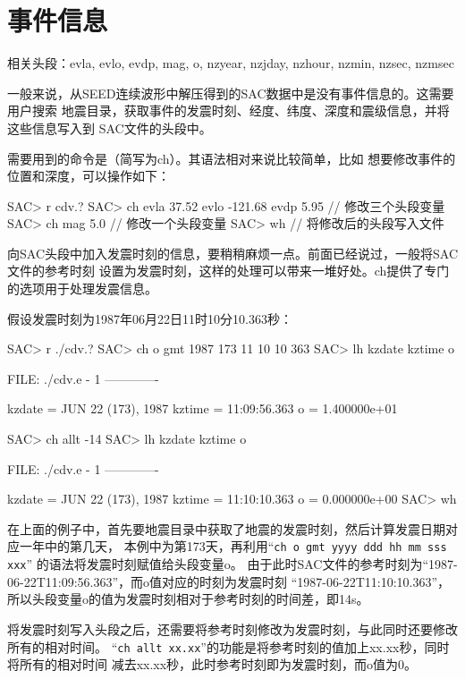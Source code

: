 \section{事件信息}
\label{sec:event-info}
相关头段：evla, evlo, evdp, mag, o, nzyear, nzjday, nzhour, nzmin, nzsec, nzmsec

一般来说，从SEED连续波形中解压得到的SAC数据中是没有事件信息的。这需要用户搜索
地震目录，获取事件的发震时刻、经度、纬度、深度和震级信息，并将这些信息写入到
SAC文件的头段中。

需要用到的命令是（简写为ch）。其语法相对来说比较简单，比如
想要修改事件的位置和深度，可以操作如下：
\begin{SACCode}
SAC> r cdv.?
SAC> ch evla 37.52 evlo -121.68 evdp 5.95   // 修改三个头段变量
SAC> ch mag 5.0                             // 修改一个头段变量
SAC> wh                                     // 将修改后的头段写入文件
\end{SACCode}

向SAC头段中加入发震时刻的信息，要稍稍麻烦一点。前面已经说过，一般将SAC文件的参考时刻
设置为发震时刻，这样的处理可以带来一堆好处。ch提供了专门的选项用于处理发震信息。

假设发震时刻为1987年06月22日11时10分10.363秒：
\label{code:origin-time}
\begin{SACCode}
SAC> r ./cdv.?
SAC> ch o gmt 1987 173 11 10 10 363
SAC> lh kzdate kztime o
  
  FILE: ./cdv.e - 1
 -------------

     kzdate = JUN 22 (173), 1987
     kztime = 11:09:56.363
          o = 1.400000e+01
  
SAC> ch allt -14
SAC> lh kzdate kztime o
  
  FILE: ./cdv.e - 1
 -------------

     kzdate = JUN 22 (173), 1987
     kztime = 11:10:10.363
          o = 0.000000e+00
SAC> wh
\end{SACCode}

在上面的例子中，首先要地震目录中获取了地震的发震时刻，然后计算发震日期对应一年中的第几天，
本例中为第173天，再利用``\lstinline{ch o gmt yyyy ddd hh mm sss xxx}''
的语法将发震时刻赋值给头段变量o。
由于此时SAC文件的参考时刻为``1987-06-22T11:09:56.363''，而o值对应的时刻为发震时刻
``1987-06-22T11:10:10.363''，所以头段变量o的值为发震时刻相对于参考时刻的时间差，即14s。

将发震时刻写入头段之后，还需要将参考时刻修改为发震时刻，与此同时还要修改所有的相对时间。
``\lstinline{ch allt xx.xx}''的功能是将参考时刻的值加上xx.xx秒，同时将所有的相对时间
减去xx.xx秒，此时参考时刻即为发震时刻，而o值为0。

